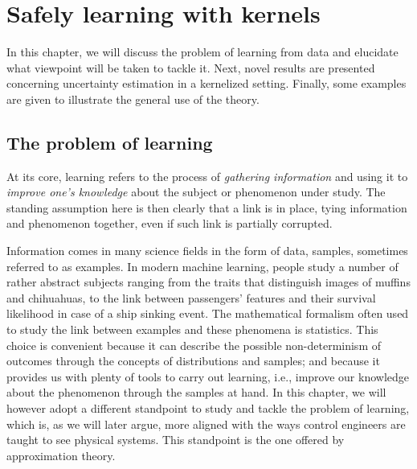 \cleardoublepage
\chapter{Safely learning with kernels}

In this chapter, we will discuss the problem of learning from data and elucidate what viewpoint will be taken to tackle it. Next, novel results are presented concerning uncertainty estimation in a kernelized setting. Finally, some examples are given to illustrate the general use of the theory.

\section{The problem of learning}

At its core, learning refers to the process of \textit{gathering information} and using it to \textit{improve one's knowledge} about the subject or phenomenon under study. The standing assumption here is then clearly that a link is in place, tying information and phenomenon together, even if such link is partially corrupted.

Information comes in many science fields in the form of data, samples, sometimes referred to as examples. In modern machine learning, people study a number of rather abstract subjects ranging from the traits that distinguish images of muffins and chihuahuas, to the link between passengers' features and their survival likelihood in case of a ship sinking event.  The mathematical formalism often used to study the link between examples and these phenomena is statistics. This choice is convenient because it can describe the possible non-determinism of outcomes through the concepts of distributions and samples; and because it provides us with plenty of tools to carry out learning, i.e., improve our knowledge about the phenomenon through the samples at hand. In this chapter, we will however adopt a different standpoint to study and tackle the problem of learning, which is, as we will later argue, more aligned with the ways control engineers are taught to see physical systems. This standpoint is the one offered by approximation theory.


